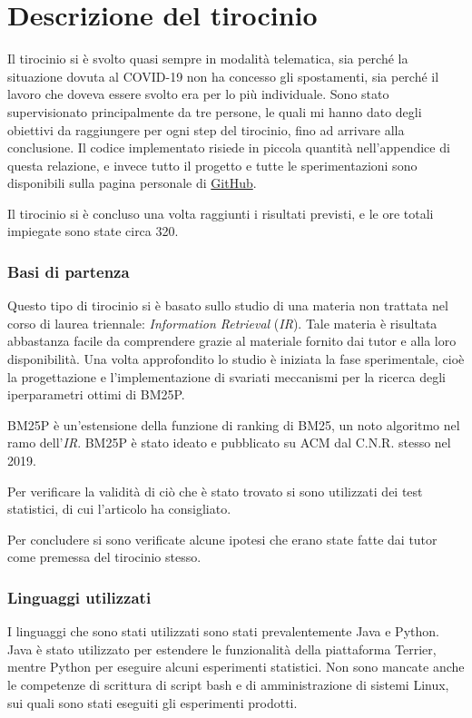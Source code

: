 \chapter{Descrizione del tirocinio}

Il tirocinio si è svolto quasi sempre in modalità telematica,
sia perché la situazione dovuta al COVID-19 non ha concesso
gli spostamenti, sia perché  il lavoro che doveva essere svolto
era per lo più individuale.
Sono stato supervisionato principalmente da tre persone,
le quali mi hanno dato degli obiettivi da raggiungere per ogni
step del tirocinio,
fino ad arrivare alla conclusione.
Il codice implementato risiede in piccola
quantità nell'appendice di questa relazione,
e invece tutto il progetto e tutte le sperimentazioni
sono disponibili sulla pagina personale di \href{https://github.com/federicosilvestri/bm25p-thesis}{GitHub}.

Il tirocinio si è concluso una volta raggiunti i risultati
previsti, e le ore totali impiegate sono state circa 320.

\subsection{Basi di partenza}
Questo tipo di tirocinio si è basato
sullo studio di una materia non trattata nel corso di laurea triennale:
\textit{Information Retrieval} (\textit{IR}).
Tale materia è risultata abbastanza facile da comprendere grazie
al materiale fornito dai tutor e alla loro disponibilità.
Una volta approfondito lo studio è iniziata la fase sperimentale,
cioè la progettazione e l'implementazione di svariati meccanismi per la ricerca 
degli iperparametri ottimi di BM25P.

BM25P è un'estensione della funzione di ranking
di BM25, un noto algoritmo nel ramo dell'\textit{IR}.
BM25P è stato ideato e pubblicato su ACM dal C.N.R.
stesso nel 2019.\cite{10.1145/3331184.3331373}

Per verificare la validità di ciò che è stato trovato
si sono utilizzati dei test statistici, di cui l'articolo\cite{10.1145/1321440.1321528}
ha consigliato.

Per concludere si sono verificate alcune ipotesi
che erano state fatte dai tutor come premessa
del tirocinio stesso.

\subsection{Linguaggi utilizzati}
I linguaggi che sono stati utilizzati sono stati prevalentemente Java e Python.
Java è stato utilizzato per estendere le funzionalità della piattaforma Terrier,
mentre Python per eseguire alcuni esperimenti statistici.
Non sono mancate anche le competenze di scrittura di script
bash e di amministrazione di sistemi Linux, sui quali sono stati
eseguiti gli esperimenti prodotti.

